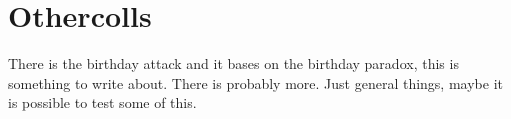 \chapter{Othercolls}
There is the birthday attack and it bases on the birthday paradox, this is something to write about. There is probably more.
Just general things, maybe it is possible to test some of this.
